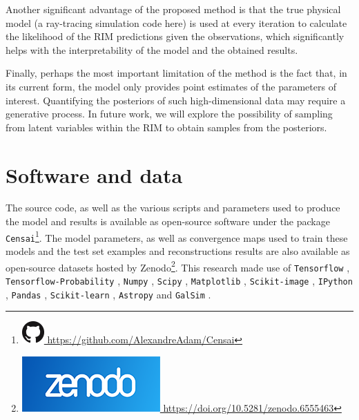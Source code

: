 Another significant advantage of the proposed method is that the true physical model (a ray-tracing simulation code here) is used at every iteration to calculate the likelihood of the RIM predictions given the observations, which significantly helps with the interpretability of the model and the obtained results. 

Finally, perhaps the most important limitation of the method is the fact that, in its current form, the model only provides point estimates of the parameters of interest. Quantifying the posteriors of such high-dimensional data may require a generative process. In future work, we will explore the possibility of sampling from latent variables within the RIM to obtain samples from the posteriors.  

\section*{Software and data}
The source code, as well as the various scripts and parameters used to 
produce the model and results is available as open-source software 
under the package \texttt{Censai}\footnote{
\href{https://github.com/AlexandreAdam/Censai}{
\includegraphics[scale=0.25]{figures/GitHub-Mark-32px.png}
https://github.com/AlexandreAdam/Censai}}. 
The model parameters, as well as convergence maps used to train 
these models and the test set examples and reconstructions results are also available as open-source datasets hosted by Zenodo\footnote{\href{https://doi.org/10.5281/zenodo.6555463}
{\includegraphics[scale=0.1]{figures/zenodo}
https://doi.org/10.5281/zenodo.6555463}}. This research made use of \texttt{Tensorflow} \citep{tensorflow}, 
\texttt{Tensorflow-Probability} \citep{tensorflow-probability}, 
\texttt{Numpy} \citep{numpy}, 
\texttt{Scipy} \citep{scipy}, 
\texttt{Matplotlib} \citep{matplotlib}, 
\texttt{Scikit-image} \citep{scikit-image}, 
\texttt{IPython} \citep{ipython}, 
\texttt{Pandas} \citep{pandas1}, 
\texttt{Scikit-learn} \citep{scikit-learn}, 
\texttt{Astropy} \citep{astropy:2013,astropy:2018} 
and \texttt{GalSim} \citep{galsim}.


